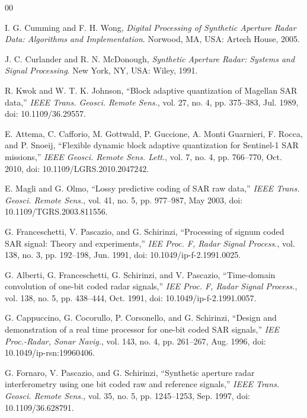 \documentclass[conference]{IEEEtran}
\begin{document}
\newpage
\begin{thebibliography}{00}

I. G. Cumming and F. H. Wong, \textit{Digital Processing of Synthetic Aperture Radar Data: Algorithms and Implementation}. Norwood, MA, USA: Artech House, 2005.

J. C. Curlander and R. N. McDonough, \textit{Synthetic Aperture Radar: Systems and Signal Processing}. New York, NY, USA: Wiley, 1991.

R. Kwok and W. T. K. Johnson, ``Block adaptive quantization of Magellan SAR data,'' \textit{IEEE Trans. Geosci. Remote Sens.}, vol. 27, no. 4, pp. 375--383, Jul. 1989, doi: 10.1109/36.29557.

E. Attema, C. Cafforio, M. Gottwald, P. Guccione, A. Monti Guarnieri, F. Rocca, and P. Snoeij, ``Flexible dynamic block adaptive quantization for Sentinel-1 SAR missions,'' \textit{IEEE Geosci. Remote Sens. Lett.}, vol. 7, no. 4, pp. 766--770, Oct. 2010, doi: 10.1109/LGRS.2010.2047242.

E. Magli and G. Olmo, ``Lossy predictive coding of SAR raw data,'' \textit{IEEE Trans. Geosci. Remote Sens.}, vol. 41, no. 5, pp. 977--987, May 2003, doi: 10.1109/TGRS.2003.811556.

G. Franceschetti, V. Pascazio, and G. Schirinzi, ``Processing of signum coded SAR signal: Theory and experiments,'' \textit{IEE Proc. F, Radar Signal Process.}, vol. 138, no. 3, pp. 192--198, Jun. 1991, doi: 10.1049/ip-f-2.1991.0025.

G. Alberti, G. Franceschetti, G. Schirinzi, and V. Pascazio, ``Time-domain convolution of one-bit coded radar signals,'' \textit{IEE Proc. F, Radar Signal Process.}, vol. 138, no. 5, pp. 438--444, Oct. 1991, doi: 10.1049/ip-f-2.1991.0057.

G. Cappuccino, G. Cocorullo, P. Corsonello, and G. Schirinzi, ``Design and demonstration of a real time processor for one-bit coded SAR signals,'' \textit{IEE Proc.-Radar, Sonar Navig.}, vol. 143, no. 4, pp. 261--267, Aug. 1996, doi: 10.1049/ip-rsn:19960406.

G. Fornaro, V. Pascazio, and G. Schirinzi, ``Synthetic aperture radar interferometry using one bit coded raw and reference signals,'' \textit{IEEE Trans. Geosci. Remote Sens.}, vol. 35, no. 5, pp. 1245--1253, Sep. 1997, doi: 10.1109/36.628791.


\end{thebibliography}
\end{document}
